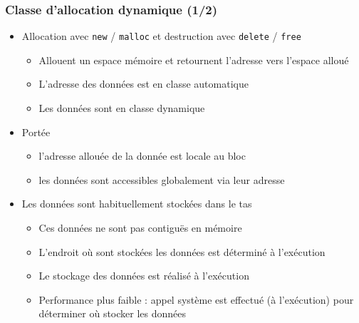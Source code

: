 \begin{frame}
\frametitle{Classe d'allocation dynamique (1/2)}
\begin{itemize}[<+->]
\item Allocation avec \lstinline|new| / \texttt{malloc} et destruction avec \lstinline|delete| / \texttt{free}
	\begin{itemize}
	\item Allouent un espace mémoire et retournent l'adresse vers l'espace alloué
	\item L'adresse des données est en classe automatique
	\item Les données sont en classe dynamique
	\end{itemize}
\item Portée
	\begin{itemize}
	\item l'adresse allouée de la donnée est locale au bloc
	\item les données sont accessibles globalement via leur adresse
	\end{itemize}
\item Les données sont habituellement stockées dans le tas
	\begin{itemize}
	\item Ces données ne sont pas contiguës en mémoire
	\item L'endroit où sont stockées les données est déterminé à l'exécution
	\item Le stockage des données est réalisé à l'exécution
	\item Performance plus faible : appel système est effectué (à l'exécution) pour déterminer où stocker les données
	\end{itemize}
\end{itemize}
\end{frame}

